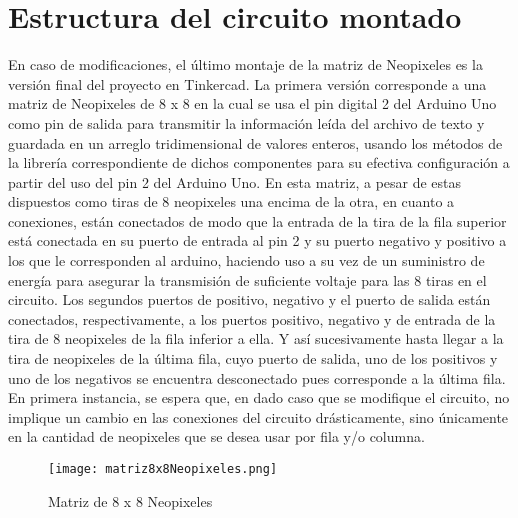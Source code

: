 \documentclass{article}
\begin{document}
\section{Estructura del circuito montado}
En caso de modificaciones, el último montaje de la matriz de Neopixeles es la versión final del proyecto en Tinkercad. La primera versión corresponde a una matriz de Neopixeles de 8 x 8 en la cual se usa el pin digital 2 del Arduino Uno como pin de salida para transmitir la información leída del archivo de texto y guardada en un arreglo tridimensional de valores enteros, usando los métodos de la librería correspondiente de dichos componentes para su efectiva configuración a partir del uso del pin 2 del Arduino Uno. En esta matriz, a pesar de estas dispuestos como tiras de 8 neopixeles una encima de la otra, en cuanto a conexiones, están conectados de modo que la entrada de la tira de la fila superior está conectada en su puerto de entrada al pin 2 y su puerto negativo y positivo a los que le corresponden al arduino, haciendo uso a su vez de un suministro de energía para asegurar la transmisión de suficiente voltaje para las 8 tiras en el circuito. Los segundos puertos de positivo, negativo y el puerto de salida están conectados, respectivamente, a los puertos positivo, negativo y de entrada de la tira de 8 neopixeles de la fila inferior a ella. Y así sucesivamente hasta llegar a la tira de neopixeles de la última fila, cuyo puerto de salida, uno de los positivos y uno de los negativos se encuentra desconectado pues corresponde a la última fila. En primera instancia, se espera que, en dado caso que se modifique el circuito, no implique un cambio en las conexiones del circuito drásticamente, sino únicamente en la cantidad de neopixeles que se desea usar por fila y/o columna.
\begin{figure} 
    \centering
    \texttt{[image: matriz8x8Neopixeles.png]}
    \caption{Matriz de 8 x 8 Neopixeles}
    \label{fig:mat8x8_neo}
\end{figure}
\end{document}

